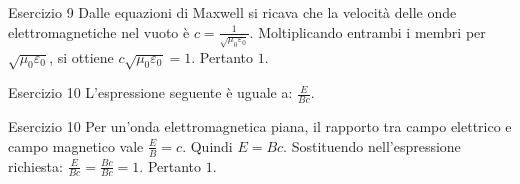 \documentclass[a4paper]{article}
\begin{document}
\begin{snippetsolution}{Esercizio 9}
    Dalle equazioni di Maxwell si ricava che la velocità delle onde
    elettromagnetiche nel vuoto è
    \(c = \frac{1}{\sqrt{\mu_0\varepsilon_0}}.\)
    Moltiplicando entrambi i membri per
    \(\sqrt{\mu_0\varepsilon_0}\), si ottiene
    \(c\sqrt{\mu_0\varepsilon_0} = 1.\)
    Pertanto
    \(\boxed{1}.\)
\end{snippetsolution}
\begin{snippetexercise}{Esercizio 10}
    L'espressione seguente è uguale a:
    \(\frac{E}{Bc}.\)

\end{snippetexercise}
\begin{snippetsolution}{Esercizio 10}
    Per un'onda elettromagnetica piana, il rapporto tra campo elettrico e campo
    magnetico vale
    \(\frac{E}{B} = c.\)
    Quindi
    \(E = Bc.\)
    Sostituendo nell'espressione richiesta:
    \(\frac{E}{Bc} = \frac{Bc}{Bc} = 1.\)
    Pertanto
    \(\boxed{1}.\)
\end{snippetsolution}
\end{document}

